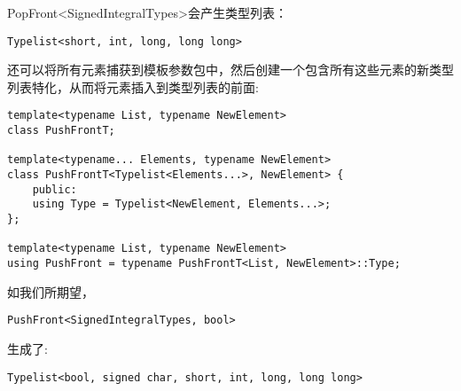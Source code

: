 PopFront<SignedIntegralTypes>会产生类型列表：

\begin{lstlisting}[style=styleCXX]
Typelist<short, int, long, long long>
\end{lstlisting}

还可以将所有元素捕获到模板参数包中，然后创建一个包含所有这些元素的新类型列表特化，从而将元素插入到类型列表的前面:

\begin{lstlisting}[style=styleCXX]
template<typename List, typename NewElement>
class PushFrontT;

template<typename... Elements, typename NewElement>
class PushFrontT<Typelist<Elements...>, NewElement> {
	public:
	using Type = Typelist<NewElement, Elements...>;
};

template<typename List, typename NewElement>
using PushFront = typename PushFrontT<List, NewElement>::Type;
\end{lstlisting}

如我们所期望，

\begin{lstlisting}[style=styleCXX]
PushFront<SignedIntegralTypes, bool>
\end{lstlisting}

生成了:

\begin{lstlisting}[style=styleCXX]
Typelist<bool, signed char, short, int, long, long long>
\end{lstlisting}









